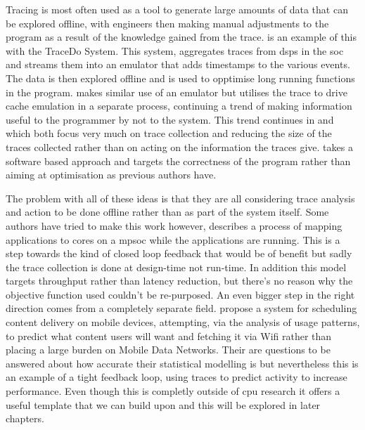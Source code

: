 Tracing is most often used as a tool to generate large amounts of data that can be explored offline, with engineers then making manual adjustments to the program as a result of the knowledge gained from the trace. \citet{huApplicationsOnchipTrace2007} is an example of this with the TraceDo System. This system, aggregates traces from \gls{dsp}s in the \gls{soc} and streams them into an emulator that adds timestamps to the various events. The data is then explored offline and is used to opptimise long running functions in the program. \citet{wangRealTimeCache2013} makes similar use of an emulator but utilises the trace to drive cache emulation in a separate process, continuing a trend of making information useful to the programmer by not to the system. This trend continues in \citet{liTracebasedAnalysisMethodology2016} and \citet{mertzPracticalFeasibilitySoftware2019} which both focus very much on trace collection and reducing the size of the traces collected rather than on acting on the information the traces give. \citet{chamskiTracebasedRuntimeAnalysis2010} takes a software based approach and targets the correctness of the program rather than aiming at optimisation as previous authors have. 

The problem with all of these ideas is that they are all considering trace analysis and action to be done offline rather than as part of the system itself. Some authors have tried to make this work however, \citet{singhResourceThroughputAware2016} describes a process of mapping applications to cores on a \gls{mpsoc} while the applications are running. This is a step towards the kind of closed loop feedback that would be of benefit but sadly the trace collection is done at design-time not run-time. In addition this model targets throughput rather than latency reduction, but there's no reason why the objective function used couldn't be re-purposed. An even bigger step in the right direction comes from a completely separate field. \citet{shoukryProactiveSchedulingContent2014} propose a system for scheduling content delivery on mobile devices, attempting, via the analysis of usage patterns, to predict what content users will want and fetching it via Wifi rather than placing a large burden on Mobile Data Networks. Their are questions to be answered about how accurate their statistical modelling is but nevertheless this is an example of a tight feedback loop, using traces to predict activity to increase performance. Even though this is completly outside of \gls{cpu} research it offers a useful template that we can build upon and this will be explored in later chapters.

